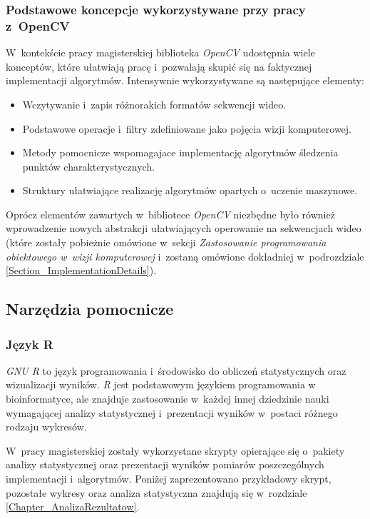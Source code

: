       \subsubsection{Podstawowe koncepcje wykorzystywane przy pracy z~OpenCV}
      W~kontekście pracy magisterskiej biblioteka \textit{OpenCV} udostępnia wiele konceptów, które ułatwiają pracę i~pozwalają skupić się na faktycznej implementacji algorytmów. Intensywnie wykorzystywane są następujące elementy:
      \begin{itemize}
        \item Wczytywanie i~zapis różnorakich formatów sekwencji wideo.
        \item Podstawowe operacje i~filtry zdefiniowane jako pojęcia wizji komputerowej.
        \item Metody pomocnicze wspomagajace implementację algorytmów śledzenia punktów charakterystycznych.
        \item Struktury ułatwiające realizację algorytmów opartych o~uczenie maszynowe.
      \end{itemize}

      Oprócz elementów zawartych w~bibliotece \textit{OpenCV} niezbędne było również wprowadzenie nowych abstrakcji ułatwiających operowanie na sekwencjach wideo (które zostały pobieżnie omówione w~sekcji \textit{Zastosowanie programowania obiektowego w~wizji komputerowej} i~zostaną omówione dokładniej w~podrozdziale \ref{Section_ImplementationDetails}).

    \subsection{Narzędzia pomocnicze}\label{Subsection_PomocniczeTechnologie}

      \subsubsection{Język R}
      \textit{GNU R} to język programowania i~środowisko do obliczeń statystycznych oraz wizualizacji wyników. \textit{R} jest podstawowym językiem programowania w bioinformatyce, ale znajduje zastosowanie w~każdej innej dziedzinie nauki wymagającej analizy statystycznej i~prezentacji wyników w~postaci różnego rodzaju wykresów.

      W~pracy magisterskiej zostały wykorzystane skrypty opierające się o~pakiety analizy statystycznej oraz prezentacji wyników pomiarów poszczególnych implementacji i~algorytmów. Poniżej zaprezentowano przykładowy skrypt, pozostałe wykresy oraz analiza statystyczna znajdują się w~rozdziale \ref{Chapter_AnalizaRezultatow}.

